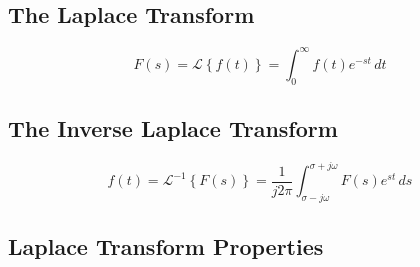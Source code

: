 

\subsection*{The Laplace Transform}
$$
F(s)=\mathcal{L}\left\{f(t)\right\}=\int_0^{\infty} f(t)e^{-st}\, dt
$$
\subsection*{The Inverse Laplace Transform}
$$
f(t)=\mathcal{L}^{-1}\left\{F(s)\right\}=\frac{1}{j2\pi}\int_{\sigma-j\omega}^{\sigma+j\omega} F(s)e^{st}\, ds
$$
\subsection*{Laplace Transform Properties}

